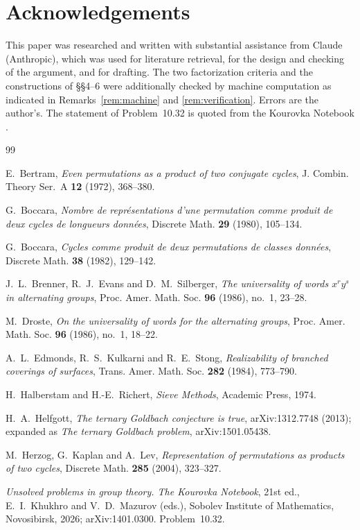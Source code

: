 \documentclass[11pt]{amsart}
\numberwithin{equation}{section}
\theoremstyle{remark}
\begin{document}
\section*{Acknowledgements}
This paper was researched and written with substantial assistance from Claude
(Anthropic), which was used for literature retrieval, for the design and checking
of the argument, and for drafting. The two factorization criteria and the
constructions of \S\S4--6 were additionally checked by machine computation as
indicated in Remarks~\ref{rem:machine} and \ref{rem:verification}. Errors are the
author's. The statement of Problem~10.32 is quoted from the Kourovka Notebook
\cite{KN}.

\begin{thebibliography}{99}

 E.~Bertram, \emph{Even permutations as a product of two
conjugate cycles}, J. Combin. Theory Ser.~A \textbf{12} (1972), 368--380.

 G.~Boccara, \emph{Nombre de repr\'esentations d'une
permutation comme produit de deux cycles de longueurs donn\'ees}, Discrete Math.
\textbf{29} (1980), 105--134.

 G.~Boccara, \emph{Cycles comme produit de deux permutations
de classes donn\'ees}, Discrete Math. \textbf{38} (1982), 129--142.

 J.~L.~Brenner, R.~J.~Evans and D.~M.~Silberger, \emph{The
universality of words $x^ry^s$ in alternating groups}, Proc. Amer. Math. Soc.
\textbf{96} (1986), no.~1, 23--28.

 M.~Droste, \emph{On the universality of words for the
alternating groups}, Proc. Amer. Math. Soc. \textbf{96} (1986), no.~1, 18--22.

 A.~L.~Edmonds, R.~S.~Kulkarni and R.~E.~Stong, \emph{Realizability
of branched coverings of surfaces}, Trans. Amer. Math. Soc. \textbf{282} (1984),
773--790.

 H.~Halberstam and H.-E.~Richert, \emph{Sieve Methods}, Academic
Press, 1974.

 H.~A.~Helfgott, \emph{The ternary Goldbach conjecture is
true}, arXiv:1312.7748 (2013); expanded as \emph{The ternary Goldbach problem},
arXiv:1501.05438.

 M.~Herzog, G.~Kaplan and A.~Lev, \emph{Representation of
permutations as products of two cycles}, Discrete Math. \textbf{285} (2004),
323--327.

 \emph{Unsolved problems in group theory. The Kourovka Notebook},
21st ed., E.~I.~Khukhro and V.~D.~Mazurov (eds.), Sobolev Institute of
Mathematics, Novosibirsk, 2026; arXiv:1401.0300. Problem~10.32.


\end{thebibliography}
\end{document}
